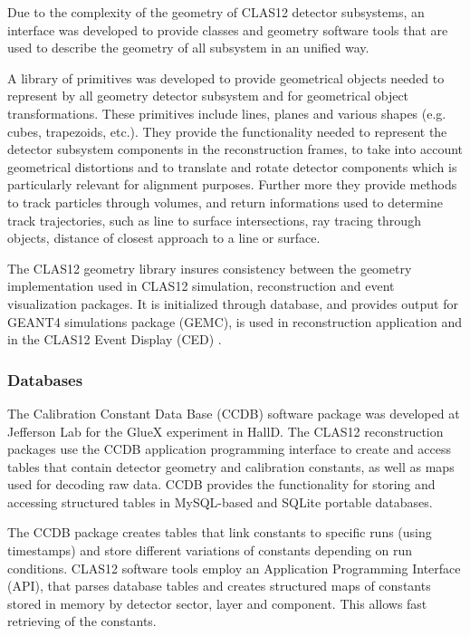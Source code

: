 \documentclass[3p,times,twocolumn]{elsarticle}
\begin{document}
Due to the complexity of the geometry of CLAS12 detector subsystems, an interface was developed
to provide classes and geometry software tools that are used to describe the geometry of all subsystem in an unified way.

A library of primitives was developed to provide geometrical objects needed to represent by all geometry detector subsystem
and for geometrical object transformations.  These primitives include lines, planes and various shapes (e.g.
cubes, trapezoids, etc.).  They provide the functionality needed
to represent the detector subsystem components in the reconstruction frames, to take into account geometrical distortions
and to translate and rotate detector components which is particularly relevant for alignment purposes.
Further more they provide methods to track particles through volumes, and return informations used to determine
track trajectories,
such as line to surface intersections, ray tracing through objects, distance of closest approach to a line or surface.

The CLAS12 geometry library insures consistency between the geometry implementation used in CLAS12 simulation, reconstruction and
event visualization packages. It is initialized through database, and provides output for GEANT4 simulations package
(GEMC), is used in reconstruction application and in the CLAS12 Event Display (CED) .

\subsubsection{Databases}

The Calibration Constant Data Base (CCDB) software package was developed at Jefferson Lab for the GlueX experiment
in HallD.  The CLAS12 reconstruction packages use the CCDB application programming interface to create and access
tables that contain detector geometry and calibration constants, as well as maps used for decoding raw data.
CCDB provides the functionality for storing and accessing
structured tables in MySQL-based and SQLite portable databases.

The CCDB package creates
tables that link constants to specific runs (using timestamps) and store different variations of constants depending on run
conditions. CLAS12 software tools employ an Application Programming Interface (API), that parses database tables and creates
structured maps of constants stored in  memory by detector sector, layer and component. This allows fast retrieving of the
constants.
\end{document}
